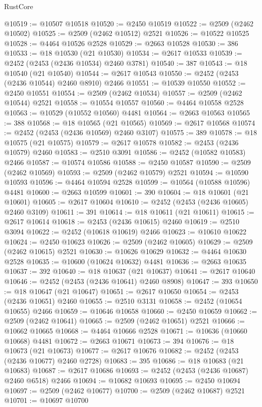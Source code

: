 \begin{lexlean}{RustCore}
\begin{coremodule}
@10519 := @10507 @10518
@10520 := @2450 @10519
@10522 := @2509 (@2462 @10502)
@10525 := @2509 (@2462 @10512) @2521
@10526 := @10522 @10525
@10528 := @4464 @10526 @2528
@10529 := @2663 @10528
@10530 := 386
@10533 := @18 @10530 (@21 @10530)
@10534 := @2617 @10533
@10539 := @2452 (@2453 (@2436 @10534) @2460 @3781)
@10540 := 387
@10543 := @18 @10540 (@21 @10540)
@10544 := @2617 @10543
@10550 := @2452 (@2453 (@2436 @10544) @2460 @8910) @2466
@10551 := @10539 @10550
@10552 := @2450 @10551
@10554 := @2509 (@2462 @10534)
@10557 := @2509 (@2462 @10544) @2521
@10558 := @10554 @10557
@10560 := @4464 @10558 @2528
@10563 := @10529 (@10552 @10560) @4481
@10564 := @2663 @10563
@10565 := 388
@10568 := @18 @10565 (@21 @10565)
@10569 := @2617 @10568
@10574 := @2452 (@2453 (@2436 @10569) @2460 @3107)
@10575 := 389
@10578 := @18 @10575 (@21 @10575)
@10579 := @2617 @10578
@10582 := @2453 (@2436 @10579) @2460
@10583 := @2510 @3091
@10586 := @2452 (@10582 @10583) @2466
@10587 := @10574 @10586
@10588 := @2450 @10587
@10590 := @2509 (@2462 @10569)
@10593 := @2509 (@2462 @10579) @2521
@10594 := @10590 @10593
@10596 := @4464 @10594 @2528
@10599 := @10564 (@10588 @10596) @4481
@10600 := @2663 @10599
@10601 := 390
@10604 := @18 @10601 (@21 @10601)
@10605 := @2617 @10604
@10610 := @2452 (@2453 (@2436 @10605) @2460 @3109)
@10611 := 391
@10614 := @18 @10611 (@21 @10611)
@10615 := @2617 @10614
@10618 := @2453 (@2436 @10615) @2460
@10619 := @2510 @3094
@10622 := @2452 (@10618 @10619) @2466
@10623 := @10610 @10622
@10624 := @2450 @10623
@10626 := @2509 (@2462 @10605)
@10629 := @2509 (@2462 @10615) @2521
@10630 := @10626 @10629
@10632 := @4464 @10630 @2528
@10635 := @10600 (@10624 @10632) @4481
@10636 := @2663 @10635
@10637 := 392
@10640 := @18 @10637 (@21 @10637)
@10641 := @2617 @10640
@10646 := @2452 (@2453 (@2436 @10641) @2460 @8908)
@10647 := 393
@10650 := @18 @10647 (@21 @10647)
@10651 := @2617 @10650
@10654 := @2453 (@2436 @10651) @2460
@10655 := @2510 @3131
@10658 := @2452 (@10654 @10655) @2466
@10659 := @10646 @10658
@10660 := @2450 @10659
@10662 := @2509 (@2462 @10641)
@10665 := @2509 (@2462 @10651) @2521
@10666 := @10662 @10665
@10668 := @4464 @10666 @2528
@10671 := @10636 (@10660 @10668) @4481
@10672 := @2663 @10671
@10673 := 394
@10676 := @18 @10673 (@21 @10673)
@10677 := @2617 @10676
@10682 := @2452 (@2453 (@2436 @10677) @2460 @2728)
@10683 := 395
@10686 := @18 @10683 (@21 @10683)
@10687 := @2617 @10686
@10693 := @2452 (@2453 (@2436 @10687) @2460 @6518) @2466
@10694 := @10682 @10693
@10695 := @2450 @10694
@10697 := @2509 (@2462 @10677)
@10700 := @2509 (@2462 @10687) @2521
@10701 := @10697 @10700

\end{coremodule}
\end{lexlean}
